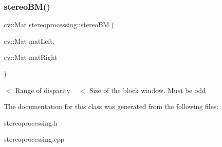 \subsubsection{\texorpdfstring{stereo\+B\+M()}{stereoBM()}}
{\footnotesize\ttfamily cv\+::\+Mat stereoprocessing\+::stereo\+BM (\begin{DoxyParamCaption}\item[{cv\+::\+Mat}]{mat\+Left,  }\item[{cv\+::\+Mat}]{mat\+Right }\end{DoxyParamCaption})}

$<$ Range of disparity ~\newline
 $<$ Size of the block window. Must be odd 

The documentation for this class was generated from the following files\+:\begin{DoxyCompactItemize}
\item 
stereoprocessing.\+h\item 
stereoprocessing.\+cpp\end{DoxyCompactItemize}

